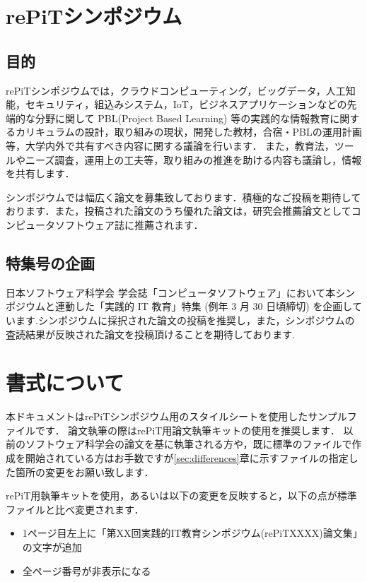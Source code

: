 \documentclass[T]{compsoft}
\begin{document}
\section{rePiTシンポジウム}
\subsection{目的}
rePiTシンポジウムでは，クラウドコンピューティング，ビッグデータ，人工知能，セキュリティ，組込みシステム，IoT，ビジネスアプリケーションなどの先端的な分野に関して
PBL(Project Based Learning) 等の実践的な情報教育に関するカリキュラムの設計，取り組みの現状，開発した教材，合宿・PBLの運用計画等，大学内外で共有すべき内容に関する議論を行います．
また，教育法，ツールやニーズ調査，運用上の工夫等，取り組みの推進を助ける内容も議論し，情報を共有します．

シンポジウムでは幅広く論文を募集致しております．積極的なご投稿を期待しております．また，投稿された論文のうち優れた論文は，研究会推薦論文としてコンピュータソフトウェア誌に推薦されます．

\subsection{特集号の企画}
日本ソフトウェア科学会 学会誌「コンピュータソフトウェア」において本シンポジウムと連動した「実践的 IT 教育」特集 (例年 3 月 30 日頃締切) を企画しています.シンポジウムに採択された論文の投稿を推奨し，また，シンポジウムの査読結果が反映された論文を投稿頂けることを期待しております.

\section{書式について} \label{sec:PaperStyle}
本ドキュメントはrePiTシンポジウム用のスタイルシートを使用したサンプルファイルです．
論文執筆の際はrePiT用論文執筆キットの使用を推奨します．
以前のソフトウェア科学会の論文を基に執筆される方や，既に標準のファイルで作成を開始されている方はお手数ですが\ref{sec:differences}章に示すファイルの指定した箇所の変更をお願い致します．

rePiT用執筆キットを使用，あるいは以下の変更を反映すると，以下の点が標準ファイルと比べ変更されます．
\begin{itemize}
	\item 1ページ目左上に「第XX回実践的IT教育シンポジウム(rePiTXXXX)論文集」の文字が追加
	\item 全ページ番号が非表示になる
\end{itemize}
\end{document}
